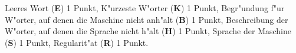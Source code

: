 \begin{bewertung}
Leeres Wort ({\bf E}) 1 Punkt,
K"urzeste W"orter ({\bf K}) 1 Punkt,
Begr"undung f"ur W"orter, auf denen die Maschine nicht anh"alt ({\bf B})
1 Punkt,
Beschreibung der W"orter, auf denen die Sprache nicht h"alt ({\bf H}) 1 Punkt,
Sprache der Maschine ({\bf S}) 1 Punkt,
Regularit"at ({\bf R}) 1 Punkt.
\end{bewertung}

